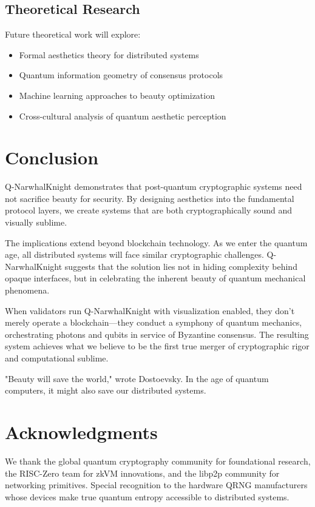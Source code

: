 \documentclass[12pt,a4paper]{article}
\begin{document}
\subsection{Theoretical Research}

Future theoretical work will explore:

\begin{itemize}
\item Formal aesthetics theory for distributed systems
\item Quantum information geometry of consensus protocols
\item Machine learning approaches to beauty optimization
\item Cross-cultural analysis of quantum aesthetic perception
\end{itemize}

\section{Conclusion}

Q-NarwhalKnight demonstrates that post-quantum cryptographic systems need not sacrifice beauty for security. By designing aesthetics into the fundamental protocol layers, we create systems that are both cryptographically sound and visually sublime.

The implications extend beyond blockchain technology. As we enter the quantum age, all distributed systems will face similar cryptographic challenges. Q-NarwhalKnight suggests that the solution lies not in hiding complexity behind opaque interfaces, but in celebrating the inherent beauty of quantum mechanical phenomena.

When validators run Q-NarwhalKnight with visualization enabled, they don't merely operate a blockchain—they conduct a symphony of quantum mechanics, orchestrating photons and qubits in service of Byzantine consensus. The resulting system achieves what we believe to be the first true merger of cryptographic rigor and computational sublime.

"Beauty will save the world," wrote Dostoevsky. In the age of quantum computers, it might also save our distributed systems.

\section*{Acknowledgments}

We thank the global quantum cryptography community for foundational research, the RISC-Zero team for zkVM innovations, and the libp2p community for networking primitives. Special recognition to the hardware QRNG manufacturers whose devices make true quantum entropy accessible to distributed systems.
\end{document}
